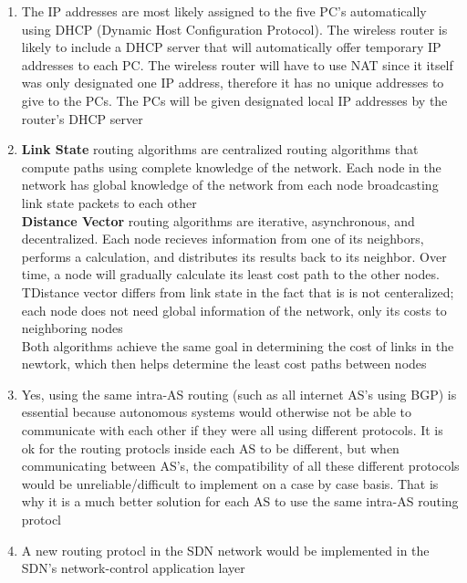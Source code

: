 \documentclass[14pt]{article}
\newcommand{\bd}{\textbf}
\begin{document}
\begin{enumerate}
\item
The IP addresses are most likely assigned to the five PC's automatically using DHCP (Dynamic Host Configuration Protocol). The wireless router is likely to include a DHCP server that will automatically offer temporary IP addresses to each PC. The wireless router will have to use NAT since it itself was only designated one IP address, therefore it has no unique addresses to give to the PCs. The PCs will be given designated local IP addresses by the router's DHCP server \\

\item
\bd{Link State} routing algorithms are centralized routing algorithms that compute paths using complete knowledge of the network. Each node in the network has global knowledge of the network from each node broadcasting link state packets to each other \\

\bd{Distance Vector} routing algorithms are iterative, asynchronous, and decentralized. Each node recieves information from one of its neighbors, performs a calculation, and distributes its results back to its neighbor. Over time, a node will gradually calculate its least cost path to the other nodes. TDistance vector differs from link state in the fact that is is not centeralized; each node does not need global information of the network, only its costs to neighboring nodes \\

Both algorithms achieve the same goal in determining the cost of links in the newtork, which then helps determine the least cost paths between nodes \\

\item
Yes, using the same intra-AS routing (such as all internet AS's using BGP) is essential because autonomous systems would otherwise not be able to communicate with each other if they were all using different protocols. It is ok for the routing protocls inside each AS to be different, but when communicating between AS's, the compatibility of all these different protocols would be unreliable/difficult to implement on a case by case basis. That is why it is a much better solution for each AS to use the same intra-AS routing protocl \\

\item
A new routing protocl in the SDN network would be implemented in the SDN's network-control application layer \\


\end{enumerate}
\end{document}
